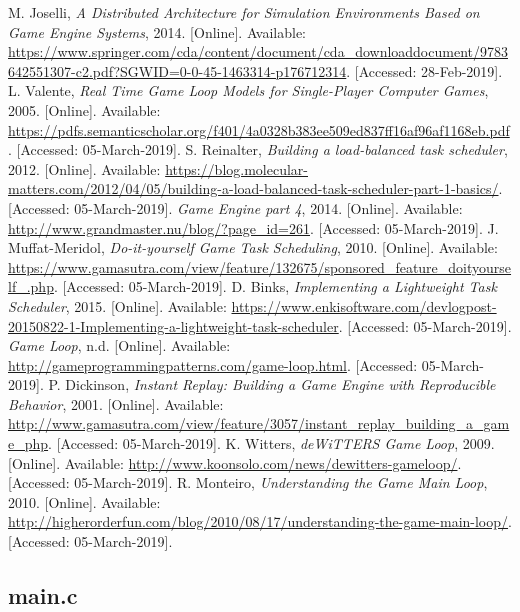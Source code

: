 \documentclass[a4paper, 12pt]{article}
\begin{document}
    \begin{thebibliography}{9}
            M. Joselli, \textit{A Distributed Architecture for Simulation Environments Based on Game Engine Systems}, 2014. [Online]. Available: \url{https://www.springer.com/cda/content/document/cda_downloaddocument/9783642551307-c2.pdf?SGWID=0-0-45-1463314-p176712314}. [Accessed: 28-Feb-2019].
            L. Valente, \textit{Real Time Game Loop Models for Single-Player Computer Games}, 2005. [Online]. Available: \url{https://pdfs.semanticscholar.org/f401/4a0328b383ee509ed837ff16af96af1168eb.pdf}. [Accessed: 05-March-2019].
            S. Reinalter, \textit{Building a load-balanced task scheduler}, 2012. [Online]. Available: \url{https://blog.molecular-matters.com/2012/04/05/building-a-load-balanced-task-scheduler-part-1-basics/}. [Accessed: 05-March-2019].
            \textit{Game Engine part 4}, 2014. [Online]. Available: \url{http://www.grandmaster.nu/blog/?page_id=261}. [Accessed: 05-March-2019].
            J. Muffat-Meridol, \textit{Do-it-yourself Game Task Scheduling}, 2010. [Online]. Available: \url{https://www.gamasutra.com/view/feature/132675/sponsored_feature_doityourself_.php}. [Accessed: 05-March-2019].
        \bibitem{}
            D. Binks, \textit{Implementing a Lightweight Task Scheduler}, 2015. [Online]. Available: \url{https://www.enkisoftware.com/devlogpost-20150822-1-Implementing-a-lightweight-task-scheduler}. [Accessed: 05-March-2019].
        \bibitem{}
            \textit{Game Loop}, n.d. [Online]. Available: \url{http://gameprogrammingpatterns.com/game-loop.html}. [Accessed: 05-March-2019].
        \bibitem{}
            P. Dickinson, \textit{Instant Replay: Building a Game Engine with Reproducible Behavior}, 2001. [Online]. Available: \url{http://www.gamasutra.com/view/feature/3057/instant_replay_building_a_game_php}. [Accessed: 05-March-2019].
        \bibitem{}
            K. Witters, \textit{deWiTTERS Game Loop}, 2009. [Online]. Available: \url{http://www.koonsolo.com/news/dewitters-gameloop/}. [Accessed: 05-March-2019].
        \bibitem{}
            R. Monteiro, \textit{Understanding the Game Main Loop}, 2010. [Online]. Available: \url{http://higherorderfun.com/blog/2010/08/17/understanding-the-game-main-loop/}. [Accessed: 05-March-2019].
    \end{thebibliography}

\newpage

\begin{appendices}

\section{main.c}

\end{appendices}
\end{document}
